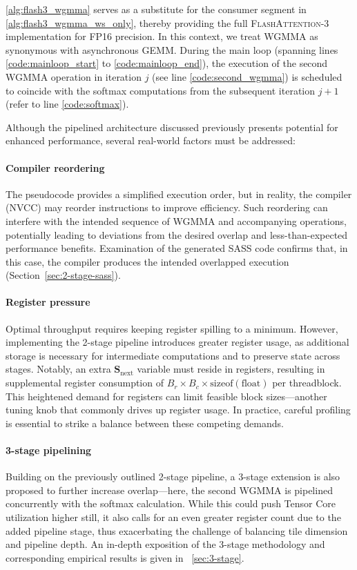 \cref{alg:flash3_wgmma} serves as a substitute for the consumer segment in \cref{alg:flash3_wgmma_ws_only}, thereby providing the full \textsc{FlashAttention-3} implementation for FP16 precision. In this context, we treat WGMMA as synonymous with asynchronous GEMM. During the main loop (spanning lines \ref{code:mainloop_start} to \ref{code:mainloop_end}), the execution of the second WGMMA operation in iteration $j$ (see line \ref{code:second_wgmma}) is scheduled to coincide with the softmax computations from the subsequent iteration $j+1$ (refer to line \ref{code:softmax}).

Although the pipelined architecture discussed previously presents potential for enhanced performance, several real-world factors must be addressed:

\paragraph{Compiler reordering} The pseudocode provides a simplified execution order, but in reality, the compiler (NVCC) may reorder instructions to improve efficiency. Such reordering can interfere with the intended sequence of WGMMA and accompanying operations, potentially leading to deviations from the desired overlap and less-than-expected performance benefits. Examination of the generated SASS code confirms that, in this case, the compiler produces the intended overlapped execution (Section~\ref{sec:2-stage-sass}).

\paragraph{Register pressure} Optimal throughput requires keeping register spilling to a minimum. However, implementing the 2-stage pipeline introduces greater register usage, as additional storage is necessary for intermediate computations and to preserve state across stages. Notably, an extra $\mathbf{S}_{\mathrm{next}}$ variable must reside in registers, resulting in supplemental register consumption of $B_r \times B_c \times \text{sizeof}(\text{float})$ per threadblock. This heightened demand for registers can limit feasible block sizes—another tuning knob that commonly drives up register usage. In practice, careful profiling is essential to strike a balance between these competing demands.

\paragraph{3-stage pipelining} Building on the previously outlined 2-stage pipeline, a 3-stage extension is also proposed to further increase overlap—here, the second WGMMA is pipelined concurrently with the softmax calculation. While this could push Tensor Core utilization higher still, it also calls for an even greater register count due to the added pipeline stage, thus exacerbating the challenge of balancing tile dimension and pipeline depth. An in-depth exposition of the 3-stage methodology and corresponding empirical results is given in ~\cref{sec:3-stage}.

